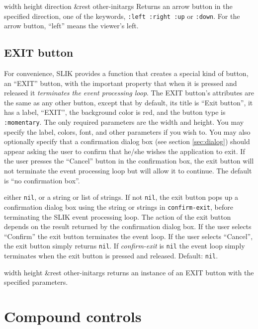 \documentclass[twoside,openright,11pt]{report}
\newcommand{\tp}[1]{\texttt{#1}}
\begin{document}
{width height direction \&rest other-initargs}
{Returns an arrow button in the specified direction, one of the
keywords, \tp{:left :right :up} or \tp{:down}.  For the arrow
button, ``left'' means the viewer's left.}

\subsection{EXIT button}

 For convenience, SLIK provides a function that
creates a special kind of button, an ``EXIT'' button, with the
important property that when it is pressed and released it
\emph{terminates the event processing loop}.  The EXIT button's
attributes are the same as any other button, except that by default,
its title is ``Exit button'', it has a label, ``EXIT'', the background
color is red, and the button type is \tp{:momentary}.  The only
required parameters are the width and height.  You may specify the
label, colors, font, and other parameters if you wish to.  You may
also optionally specify that a confirmation dialog box (see section
\ref{sec:dialog}) should appear asking the user to confirm that he/she
wishes the application to exit.  If the user presses the ``Cancel''
button in the confirmation box, the exit button will not terminate the
event processing loop but will allow it to continue.  The default is
``no confirmation box''.


{either \tp{nil}, or a string or list of strings.  If not
\tp{nil}, the exit button pops up a confirmation dialog box using
the string or strings in \tp{confirm-exit}, before terminating the
SLIK event processing loop.  The action of the exit button depends on
the result returned by the confirmation dialog box.  If the user
selects ``Confirm'' the exit button terminates the event loop.  If the
user selects ``Cancel'', the exit button simply returns \tp{nil}.
If \emph{confirm-exit} is \tp{nil} the event loop simply
terminates when the exit button is pressed and released.  Default:
\tp{nil}.}


{width height \&rest other-initargs}
{returns an instance of an EXIT button with the specified parameters.}

\section{Compound controls} \label{sec:contpan}
\end{document}

